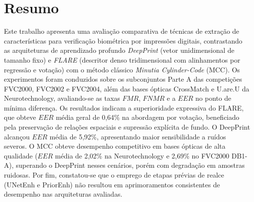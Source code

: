 \section*{Resumo}

Este trabalho apresenta uma avaliação comparativa de técnicas de extração de características para verificação biométrica por impressões digitais, contrastando as arquiteturas de aprendizado profundo \textit{DeepPrint} (vetor unidimensional de tamanho fixo) e \textit{FLARE} (descritor denso tridimensional com alinhamentos por regressão e votação) com o método clássico \textit{Minutia Cylinder-Code} (MCC). Os experimentos foram conduzidos sobre os subconjuntos Parte A das competições FVC2000, FVC2002 e FVC2004, além das bases ópticas CrossMatch e U.are.U da Neurotechnology, avaliando-se as taxas $FMR$, $FNMR$ e a $EER$ no ponto de mínima diferença. Os resultados indicam a superioridade expressiva do FLARE, que obteve $EER$ média geral de 0,64\% na abordagem por votação, beneficiado pela preservação de relações espaciais e supressão explícita de fundo. O DeepPrint alcançou $EER$ média de 5,92\%, apresentando maior sensibilidade a ruídos severos. O MCC obteve desempenho competitivo em bases ópticas de alta qualidade ($EER$ média de 2,02\% na Neurotechnology e 2,69\% no FVC2000 DB1-A), superando o DeepPrint nesses cenários, porém com degradação em amostras ruidosas. Por fim, constatou-se que o emprego de etapas prévias de realce (UNetEnh e PriorEnh) não resultou em aprimoramentos consistentes de desempenho nas arquiteturas avaliadas.